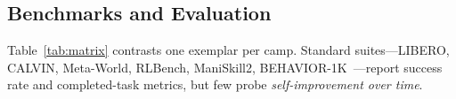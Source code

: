 \subsection{Benchmarks and Evaluation}
\label{sec:bench}

Table~\ref{tab:matrix} contrasts one exemplar per camp. Standard suites---LIBERO,
CALVIN, Meta-World, RLBench, ManiSkill2, BEHAVIOR-1K~\citep{libero,calvin,metaworld,rlbench,maniskill2,behavior1k}---report
success rate and completed-task metrics, but few probe \emph{self-improvement over time}.


